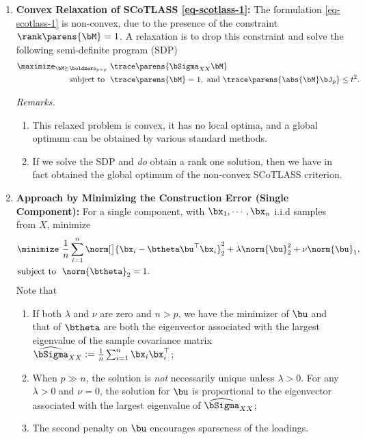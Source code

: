 \documentclass[12pt]{article}
\begin{document}
\begin{enumerate}[label=\textbf{\arabic*.}]
\begin{enumerate}
	\end{enumerate}
	
	\item \textbf{Convex Relaxation of SCoTLASS \eqref{eq-scotlass-1}:} The formulation \eqref{eq-scotlass-1} is non-convex, due to the presence of the constraint $\rank \parens{\bM} = 1$. A relaxation is to drop this constraint and solve the following semi-definite program (SDP)
	\begin{equation*}
		\begin{aligned}
			\maximize_{\bM \succeq \boldzero_{p \times p}} & \ \trace \parens{\bSigma_{XX} \bM} \\ 
			\text{ subject to } & \ \trace \parens{\bM} = 1, \text{ and } \trace \parens{\abs{\bM} \bJ_p} \le t^2. 
		\end{aligned}
	\end{equation*}
	
	\textit{Remarks.}
	\begin{enumerate}
		\item This relaxed problem is convex, it has no local optima, and a global optimum can be obtained by various standard methods. 
		\item If we solve the SDP and \emph{do} obtain a rank one solution, then we have in fact obtained the global optimum of the non-convex SCoTLASS criterion. 
	\end{enumerate}
	
	\item \textbf{Approach by Minimizing the Construction Error (Single Component):} For a single component, with $\bx_1, \cdots, \bx_n$ i.i.d samples from $X$, minimize 
	\begin{equation*}
		\begin{aligned}
			\minimize & \ \frac{1}{n} \sum_{i=1}^n \norm[\big]{\bx_i - \btheta \bu^\top \bx_i}_2^2 + \lambda \norm{\bu}_2^2 + \nu \norm{\bu}_1,  \\ 
			\text{subject to } & \ \norm{\btheta}_2 = 1. 
		\end{aligned}
	\end{equation*}
	Note that 
	\begin{enumerate}
		\item If both $\lambda$ and $\nu$ are zero and $n > p$, we have the minimizer of $\bu$ and that of $\btheta$ are both the eigenvector associated with the largest eigenvalue of the sample covariance matrix $\widehat{\bSigma}_{XX} := \frac{1}{n} \sum_{i=1}^n \bx_i \bx_i^\top$; 
		\item When $p \gg n$, the solution is \emph{not} necessarily unique unless $\lambda > 0$. For any $\lambda > 0$ and $\nu = 0$, the solution for $\bu$ is proportional to the eigenvector associated with the largest eigenvalue of $\widehat{\bSigma}_{XX}$; 
		\item The second penalty on $\bu$ encourages sparseness of the loadings. 
	\end{enumerate}
	

\end{enumerate}
\end{document}

